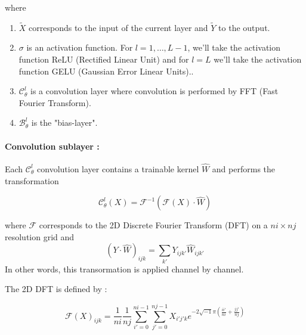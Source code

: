 where
\begin{enumerate}[label=\textbullet]
	\item $\tilde{X}$ corresponds to the input of the current layer and $\tilde{Y}$ to the output.
	\item $\sigma$ is an activation function. For $l=1,\dots,L-1$, we'll take the activation function ReLU (Rectified Linear Unit) and for $l=L$ we'll take the activation function GELU (Gaussian Error Linear Units)..
	\item $\mathcal{C}_\theta^l$ is a convolution layer where convolution is performed by FFT (Fast Fourier Transform).
	\item $\mathcal{B}_\theta^l$ is the "bias-layer".
\end{enumerate}

\paragraph{Convolution sublayer :}


Each $\mathcal{C}_\theta^l$ convolution layer contains a trainable kernel $\hat{W}$ and performs the transformation

\begin{equation*}
	\mathcal{C}_\theta^l(X)=\mathcal{F}^{-1}(\mathcal{F}(X)\cdot\hat{W})
\end{equation*}


where $\mathcal{F}$ corresponds to the 2D Discrete Fourier Transform (DFT) on a $ni\times nj$ resolution grid and
\begin{equation*}
	(Y\cdot\hat{W})_{ijk}=\sum_{k'}Y_{ijk'}\hat{W}_{ijk'}
\end{equation*}
In other words, this transormation is applied channel by channel.

\newpage

The 2D DFT is defined by :


\begin{equation*}
\mathcal{F}(X)_{ijk}=\frac{1}{ni}\frac{1}{nj}\sum_{i'=0}^{ni-1}\sum_{j'=0}^{nj-1}X_{i'j'k}e^{-2\sqrt{-1}\pi\left(\frac{ii'}{ni}+\frac{jj'}{nj}\right)}
\end{equation*}

